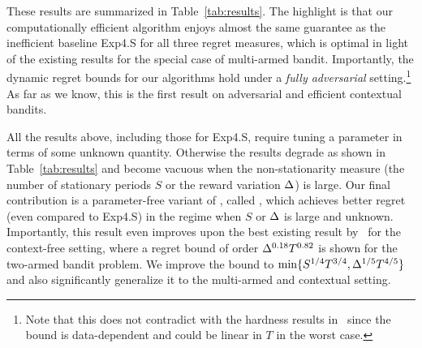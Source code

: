 These results are summarized in Table~\ref{tab:results}.
The highlight is that our computationally efficient algorithm \AdaILTCB enjoys almost the same guarantee
as the inefficient baseline Exp4.S for all three regret measures,
which is optimal in light of the existing results for the special case of multi-armed bandit.
Importantly, the dynamic regret bounds for our algorithms hold under
a {\it fully adversarial} setting.\footnote{Note that this does not contradict with the hardness results in~\citep{Hazan2016}
since the bound is data-dependent and could be linear in $T$ in the worst case.}
As far as we know, this is the first result on adversarial and efficient contextual bandits.

All the results above, including those for Exp4.S, require tuning a parameter
in terms of some unknown quantity. Otherwise the results degrade as shown in Table~\ref{tab:results}
and become vacuous when the non-stationarity measure (the number of stationary periods $S$ or the reward variation $\Delta$) is large.
Our final contribution is a parameter-free variant of \AdaEG, called \AdaBIN,
which achieves better regret (even compared to Exp4.S) in the regime when $S$ or $\Delta$ is large and unknown.
Importantly, this result even improves upon the best existing result by~\citet{KarninAn16} for the context-free setting,
where a regret bound of order $\Delta^{0.18}T^{0.82}$ is shown for the two-armed bandit problem.
We improve the bound to $\min\{S^{1/4}T^{3/4}, \Delta^{1/5}T^{4/5}\}$ and also significantly generalize it to 
the multi-armed and contextual setting.



